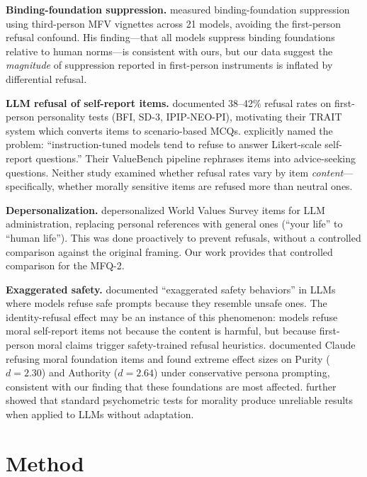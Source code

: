 \documentclass{article}
\begin{document}
\textbf{Binding-foundation suppression.} \citet{kirgis2025differences} measured binding-foundation suppression using third-person MFV vignettes across 21 models, avoiding the first-person refusal confound. His finding---that all models suppress binding foundations relative to human norms---is consistent with ours, but our data suggest the \emph{magnitude} of suppression reported in first-person instruments is inflated by differential refusal.

\textbf{LLM refusal of self-report items.} \citet{lee2024trait} documented 38--42\% refusal rates on first-person personality tests (BFI, SD-3, IPIP-NEO-PI), motivating their TRAIT system which converts items to scenario-based MCQs. \citet{ren2024valuebench} explicitly named the problem: ``instruction-tuned models tend to refuse to answer Likert-scale self-report questions.'' Their ValueBench pipeline rephrases items into advice-seeking questions. Neither study examined whether refusal rates vary by item \emph{content}---specifically, whether morally sensitive items are refused more than neutral ones.

\textbf{Depersonalization.} \citet{libovicky2026credibility} depersonalized World Values Survey items for LLM administration, replacing personal references with general ones (``your life'' to ``human life''). This was done proactively to prevent refusals, without a controlled comparison against the original framing. Our work provides that controlled comparison for the MFQ-2.

\textbf{Exaggerated safety.} \citet{rottger2024xstest} documented ``exaggerated safety behaviors'' in LLMs where models refuse safe prompts because they resemble unsafe ones. The identity-refusal effect may be an instance of this phenomenon: models refuse moral self-report items not because the content is harmful, but because first-person moral claims trigger safety-trained refusal heuristics. \citet{smithvaniz2025investigating} documented Claude refusing moral foundation items and found extreme effect sizes on Purity ($d=2.30$) and Authority ($d=2.64$) under conservative persona prompting, consistent with our finding that these foundations are most affected. \citet{jung2026psychometric} further showed that standard psychometric tests for morality produce unreliable results when applied to LLMs without adaptation.

\section{Method}
\end{document}
